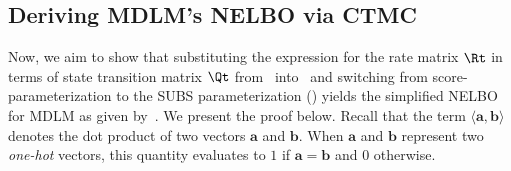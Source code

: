 \documentclass{article} %
\def\algo{MDLM}
\begin{document}
{\begin{appendices}
\subsection{Deriving \algo{}'s NELBO via CTMC}\label{app:subsec:subs_nelbo_ctmc}
Now, we aim to show that substituting the expression for the rate matrix $\Rt$ in terms of state transition matrix $\Qt$ from~ into~ and switching from score-parameterization to the SUBS parameterization () yields the simplified NELBO for MDLM as given by~. We present the proof below. Recall that the term $\langle \mathbf{a}, \mathbf{b} \rangle$ denotes the dot product of two vectors $\mathbf{a}$ and $\mathbf{b}$. 
When $ \mathbf{a}$ and $\mathbf{b}$ represent two \textit{one-hot} vectors, this quantity evaluates to $1$ if $\mathbf{a} = \mathbf{b}$ and $0$ otherwise. 


\end{appendices}}
\end{document}
